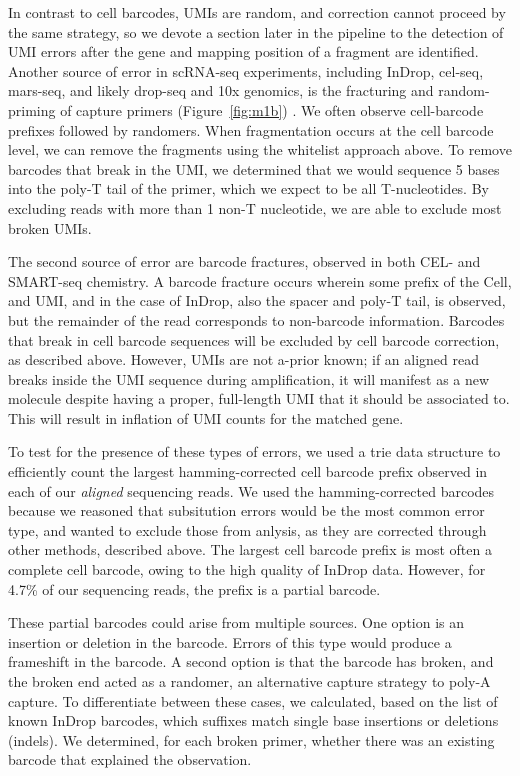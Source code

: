 In contrast to cell barcodes, UMIs are random, and correction cannot proceed by the same strategy, so we devote a section later in the pipeline to the detection of UMI errors after the gene and mapping position of a fragment are identified.
Another source of error in scRNA-seq experiments, including InDrop, cel-seq, mars-seq, and likely drop-seq and 10x genomics, is the fracturing and random-priming of capture primers (Figure~\ref{fig:m1b}) \citep{Jaitin2014}. 
We often observe cell-barcode prefixes followed by randomers. 
When fragmentation occurs at the cell barcode level, we can remove the fragments using the whitelist approach above. To remove barcodes that break in the UMI, we determined that we would sequence 5 bases into the poly-T tail of the primer, which we expect to be all T-nucleotides. 
By excluding reads with more than 1 non-T nucleotide, we are able to exclude most broken UMIs.

The second source of error are barcode fractures, observed in both CEL- and SMART-seq chemistry. %
A barcode fracture occurs wherein some prefix of the Cell, and UMI, and in the case of InDrop, also the spacer and poly-T tail, is observed, but the remainder of the read corresponds to non-barcode information. 
Barcodes that break in cell barcode sequences will be excluded by cell barcode correction, as described above. 
However, UMIs are not a-prior known; if an aligned read breaks inside the UMI sequence during amplification, it will manifest as a new molecule despite having a proper, full-length UMI that it should be associated to.
This will result in inflation of UMI counts for the matched gene. 

To test for the presence of these types of errors, we used a {\mono trie} data structure to efficiently count the largest hamming-corrected cell barcode prefix observed in each of our \textit{aligned} sequencing reads. 
We used the hamming-corrected barcodes because we reasoned that subsitution errors would be the most common error type, and wanted to exclude those from anlysis, as they are corrected through other methods, described above. 
The largest cell barcode prefix is most often a complete cell barcode, owing to the high quality of InDrop data. 
However, for 4.7\% of our sequencing reads, the prefix is a partial barcode.  %

These partial barcodes could arise from multiple sources. 
One option is an insertion or deletion in the barcode. 
Errors of this type would produce a frameshift in the barcode. 
A second option is that the barcode has broken, and the broken end acted as a randomer, an alternative capture strategy to poly-A capture. 
To differentiate between these cases, we calculated, based on the list of known InDrop barcodes, which suffixes match single base insertions or deletions (indels). We determined, for each broken primer, whether there was an existing barcode that explained the observation. 


